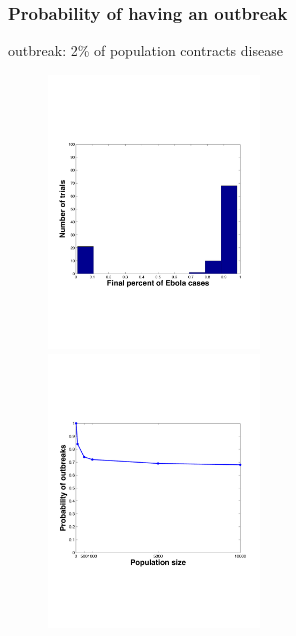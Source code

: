 \documentclass[30pt]{beamer}
\begin{document}
\begin{frame}
\frametitle{Probability of having an outbreak}
\vspace{5mm}
\textcolor{myblue}{outbreak}: 2\% of population contracts disease
\begin{figure}
\includegraphics[width = 0.5\textwidth]{N100Hist.pdf}
\includegraphics[width = 0.5\textwidth]{OutbreakProb.pdf}
\end{figure}
\end{frame}
\end{document}
